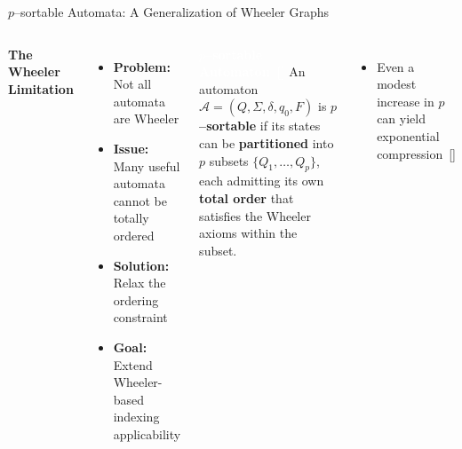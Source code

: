 \documentclass[aspectratio=169]{beamer}
\begin{document}
\begin{frame}{$p$--sortable Automata: A Generalization of Wheeler Graphs}
	\begin{columns}[c]
		\textcolor{oiRed}{\textbf{The Wheeler Limitation}}
		\begin{itemize}
			\item \textbf{Problem:} Not all automata are Wheeler
			\item \textbf{Issue:} Many useful automata cannot be totally ordered
			\item \textbf{Solution:} Relax the ordering constraint
			\item \textbf{Goal:} Extend Wheeler-based indexing applicability
		\end{itemize}

		\begin{block}{\textcolor{white}{\textbf{$p$--sortable Automaton~[\cite{cotumaccio2021indexing}]}}}
			An automaton $\mathcal{A} = (Q, \Sigma, \delta, q_0, F)$ is \textbf{$p$–sortable} if its states can be \textcolor{oiGreen}{\textbf{partitioned}} into $p$ subsets $\{Q_1, \dots, Q_p\}$, each admitting its own \textcolor{oiBlue}{\textbf{total order}} that satisfies the Wheeler axioms within the subset.
		\end{block}

		\begin{itemize}
			\item Even a modest increase in $p$ can yield exponential compression~[\cite{manziniRationalConstructionWheeler2024}]
		\end{itemize}
	\end{columns}
\end{frame}

\end{document}
